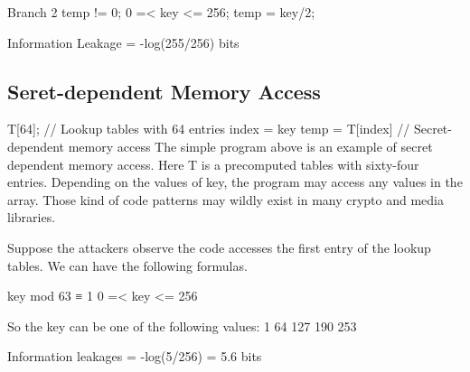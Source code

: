 Branch 2
temp != 0; 
0 =< key <= 256;
temp = key/2;

Information Leakage = -log(255/256) bits

\subsection{Seret-dependent Memory Access}


T[64]; // Lookup tables with 64 entries
index = key %
temp = T[index] // Secret-dependent memory access         
The simple program above is an example of secret dependent memory access. Here T is a precomputed tables with sixty-four entries. Depending on the values of key, the program may access any values in the array. Those kind of code patterns may wildly exist in many crypto and media libraries. 

Suppose the attackers observe the code accesses the first entry of the lookup tables. We can have the following formulas.

key mod 63 ≡ 1
0 =< key <= 256

So the key can be one of the following values:
1 64 127 190 253

Information leakages = -log(5/256) =  5.6 bits

